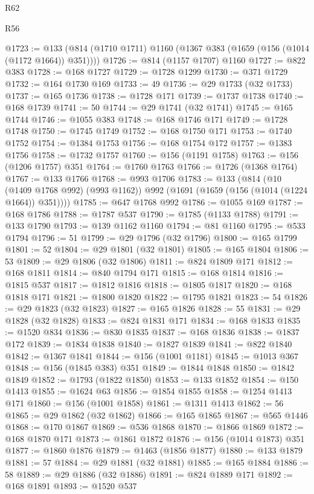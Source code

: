 \begin{lexlean}{R62}
\begin{lexlean}{R56}
\begin{coremodule}
{{{{{{{{{{{{{{{{{{{{{{{{{{{{{{{{{{{{{{{{{{{{{{{{{{{{{{{{{{{{{{{{{{{{{{{{{{{{{{{{{{{{{{{{{{{{{{{{{{{{{{{{{{{{{{{{{{{{{{{{{{{{{{{{{{{{{{{{{{{{{{{{{{{{{{{{{{{{{{{{{{{{{{{{{{{{{{{{{{{{{{{{{{{{{{{{{{{{{{{{{{{{{{{{{{{@1723 := @133 (@814 (@1710 @1711) @1160 (@1367 @383 (@1659 (@156 (@1014 (@1172 @1664)) @351))))
@1726 := @814 (@1157 @1707) @1160
@1727 := @822 @383
@1728 := @168 @1727
@1729 := @1728 @1299
@1730 := @371 @1729
@1732 := @164 @1730 @169
@1733 := 49
@1736 := @29 @1733 (@32 @1733)
@1737 := @165 @1736
@1738 := @1728 @171
@1739 := @1737 @1738
@1740 := @168 @1739
@1741 := 50
@1744 := @29 @1741 (@32 @1741)
@1745 := @165 @1744
@1746 := @1055 @383
@1748 := @168 @1746 @171
@1749 := @1728 @1748
@1750 := @1745 @1749
@1752 := @168 @1750 @171
@1753 := @1740 @1752
@1754 := @1384 @1753
@1756 := @168 @1754 @172
@1757 := @1383 @1756
@1758 := @1732 @1757
@1760 := @156 (@1191 @1758)
@1763 := @156 (@1206 @1757) @351
@1764 := @1760 @1763
@1766 := @1726 (@1368 @1764)
@1767 := @133 @1766
@1768 := @993 @1706
@1783 := @133
    (@814
      (@10 (@1409 @1768 @992) (@993 @1162))
      @992
      (@1691 (@1659 (@156 (@1014 (@1224 @1664)) @351))))
@1785 := @647 @1768 @992
@1786 := @1055 @169
@1787 := @168 @1786
@1788 := @1787 @537
@1790 := @1785 (@1133 @1788)
@1791 := @133 @1790
@1793 := @139 @1162 @1160
@1794 := @81 @1160
@1795 := @533 @1794
@1796 := 51
@1799 := @29 @1796 (@32 @1796)
@1800 := @165 @1799
@1801 := 52
@1804 := @29 @1801 (@32 @1801)
@1805 := @165 @1804
@1806 := 53
@1809 := @29 @1806 (@32 @1806)
@1811 := @824 @1809 @171
@1812 := @168 @1811
@1814 := @840 @1794 @171
@1815 := @168 @1814
@1816 := @1815 @537
@1817 := @1812 @1816
@1818 := @1805 @1817
@1820 := @168 @1818 @171
@1821 := @1800 @1820
@1822 := @1795 @1821
@1823 := 54
@1826 := @29 @1823 (@32 @1823)
@1827 := @165 @1826
@1828 := 55
@1831 := @29 @1828 (@32 @1828)
@1833 := @824 @1831 @171
@1834 := @168 @1833
@1835 := @1520 @834
@1836 := @830 @1835
@1837 := @168 @1836
@1838 := @1837 @172
@1839 := @1834 @1838
@1840 := @1827 @1839
@1841 := @822 @1840
@1842 := @1367 @1841
@1844 := @156 (@1001 @1181)
@1845 := @1013 @367
@1848 := @156 (@1845 @383) @351
@1849 := @1844 @1848
@1850 := @1842 @1849
@1852 := @1793 (@1822 @1850)
@1853 := @133 @1852
@1854 := @150 @1413
@1855 := @1624 @63
@1856 := @1854 @1855
@1858 := @1254 @1413 @171
@1860 := @156 (@1001 @1858)
@1861 := @1311 @1413
@1862 := 56
@1865 := @29 @1862 (@32 @1862)
@1866 := @165 @1865
@1867 := @565 @1446
@1868 := @170 @1867
@1869 := @536 @1868
@1870 := @1866 @1869
@1872 := @168 @1870 @171
@1873 := @1861 @1872
@1876 := @156 (@1014 @1873) @351
@1877 := @1860 @1876
@1879 := @1463 (@1856 @1877)
@1880 := @133 @1879
@1881 := 57
@1884 := @29 @1881 (@32 @1881)
@1885 := @165 @1884
@1886 := 58
@1889 := @29 @1886 (@32 @1886)
@1891 := @824 @1889 @171
@1892 := @168 @1891
@1893 := @1520 @537
}}}}}}}}}}}}}}}}}}}}}}}}}}}}}}}}}}}}}}}}}}}}}}}}}}}}}}}}}}}}}}}}}}}}}}}}}}}}}}}}}}}}}}}}}}}}}}}}}}}}}}}}}}}}}}}}}}}}}}}}}}}}}}}}}}}}}}}}}}}}}}}}}}}}}}}}}}}}}}}}}}}}}}}}}}}}}}}}}}}}}}}}}}}}}}}}}}}}}}}}}}}}}}}}}}}
\end{coremodule}
\end{lexlean}
\end{lexlean}
